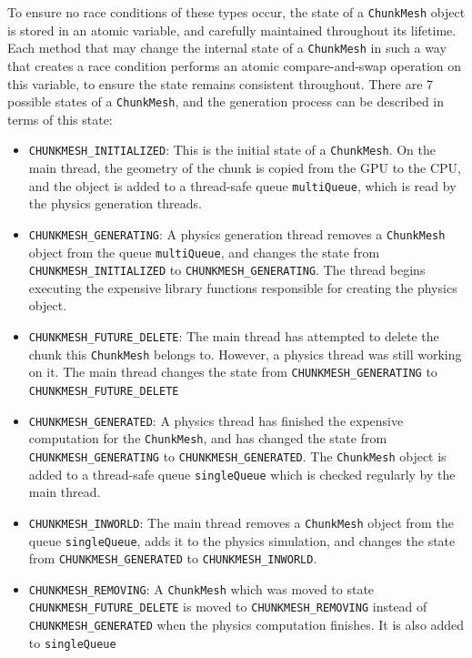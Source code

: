 \documentclass{article}
\begin{document}
To ensure no race conditions of these types occur, the state of a \texttt{ChunkMesh} object is stored in an atomic variable, and carefully maintained throughout its lifetime. Each method that may change the internal state of a \texttt{ChunkMesh} in such a way that creates a race condition performs an atomic compare-and-swap operation on this variable, to ensure the state remains consistent throughout. There are 7 possible states of a \texttt{ChunkMesh}, and the generation process can be described in terms of this state:
\begin{itemize}
 \item \texttt{CHUNKMESH\_INITIALIZED}: This is the initial state of a \texttt{ChunkMesh}. On the main thread, the geometry of the chunk is copied from the GPU to the CPU, and the object is added to a thread-safe queue \texttt{multiQueue}, which is read by the physics generation threads.
 \item \texttt{CHUNKMESH\_GENERATING}: A physics generation thread removes a \texttt{ChunkMesh} object from the queue \texttt{multiQueue}, and changes the state from \texttt{CHUNKMESH\_INITIALIZED} to \texttt{CHUNKMESH\_GENERATING}. The thread begins executing the expensive library functions responsible for creating the physics object.
 \item \texttt{CHUNKMESH\_FUTURE\_DELETE}: The main thread has attempted to delete the chunk this \texttt{ChunkMesh} belongs to. However, a physics thread was still working on it. The main thread changes the state from \texttt{CHUNKMESH\_GENERATING} to \texttt{CHUNKMESH\_FUTURE\_DELETE}
 \item \texttt{CHUNKMESH\_GENERATED}: A physics thread has finished the expensive computation for the \texttt{ChunkMesh}, and has changed the state from \texttt{CHUNKMESH\_GENERATING} to \texttt{CHUNKMESH\_GENERATED}. The \texttt{ChunkMesh} object is added to a thread-safe queue \texttt{singleQueue} which is checked regularly by the main thread.
 \item \texttt{CHUNKMESH\_INWORLD}: The main thread removes a \texttt{ChunkMesh} object from the queue \texttt{singleQueue}, adds it to the physics simulation, and changes the state from \texttt{CHUNKMESH\_GENERATED} to \texttt{CHUNKMESH\_INWORLD}.
 \item \texttt{CHUNKMESH\_REMOVING}: A \texttt{ChunkMesh} which was moved to state \texttt{CHUNKMESH\_FUTURE\_DELETE} is moved to \texttt{CHUNKMESH\_REMOVING} instead of \texttt{CHUNKMESH\_GENERATED} when the physics computation finishes. It is also added to \texttt{singleQueue}

\end{itemize}
\end{document}
